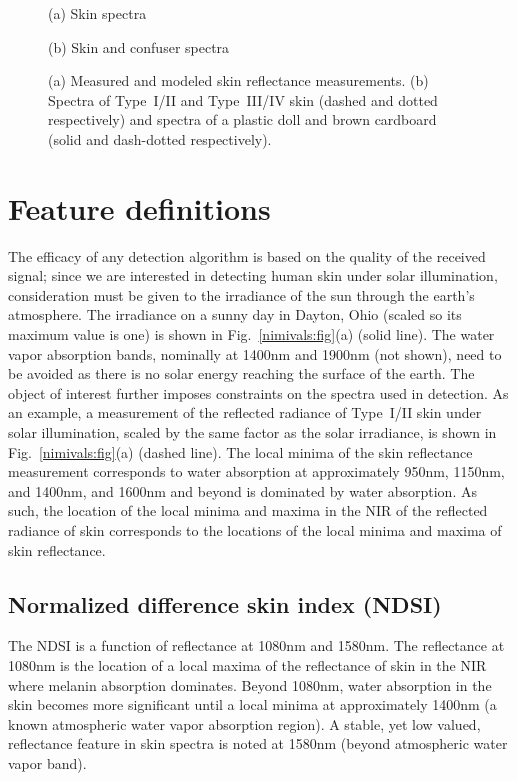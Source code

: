 \documentclass[10pt,journal,cspaper,compsoc]{IEEEtran}
\begin{document}
\begin{figure}
\begin{minipage}[b]{0.48\linewidth}
  \centering
 \centerline{}
  \centerline{(a) Skin spectra}\medskip
\end{minipage}
\hfill
\begin{minipage}[b]{0.48\linewidth}
  \centering
 \centerline{}
  \centerline{(b) Skin and confuser spectra}\medskip
\end{minipage}
\vspace{-0.5cm}
\caption{(a) Measured and modeled skin reflectance measurements. 
(b) Spectra of Type~I/II and Type~III/IV skin (dashed and dotted respectively) and spectra of a plastic doll and brown cardboard 
(solid and dash-dotted respectively).
}
\label{fairdarkmeas:fig}
\end{figure}

\section{Feature definitions}
\label{scn:detection}
The efficacy of any detection algorithm is based on the quality of the received signal; since we are interested 
in detecting human skin under solar illumination, consideration must be given to the irradiance of 
the sun through the earth's atmosphere.  The irradiance on a sunny day in Dayton, Ohio (scaled so its 
maximum value is one) is shown in Fig.~\ref{nimivals:fig}(a) (solid line). The water vapor absorption bands, 
nominally at 1400nm and 1900nm (not shown), need to be avoided as there is no solar energy reaching the surface of the earth. 
The object of interest further imposes constraints on the spectra used in detection.  As an example, 
a measurement of the reflected radiance of Type~I/II skin under solar illumination, scaled by the same factor as the solar irradiance, 
is shown in Fig.~\ref{nimivals:fig}(a) (dashed line).  The local minima of the skin reflectance measurement corresponds 
to water absorption at approximately 950nm, 1150nm, and 1400nm, and 1600nm and beyond is dominated by water absorption.  As such, 
the location of the local minima and maxima in the NIR of the reflected radiance of skin corresponds to the locations of the 
local minima and maxima of skin reflectance.

\subsection{Normalized difference skin index (NDSI)}
\label{scn:ndsi}
The  NDSI is a function of reflectance at 1080nm and 1580nm. The reflectance at 1080nm is the location of a local maxima of the 
reflectance of skin in the NIR where melanin absorption dominates.  Beyond 1080nm, water absorption in the skin becomes more 
significant until a local minima at approximately 1400nm (a known atmospheric water vapor absorption region).  A stable, yet 
low valued, reflectance feature in skin spectra is noted at 1580nm (beyond 
atmospheric water vapor band).  
\end{document}
